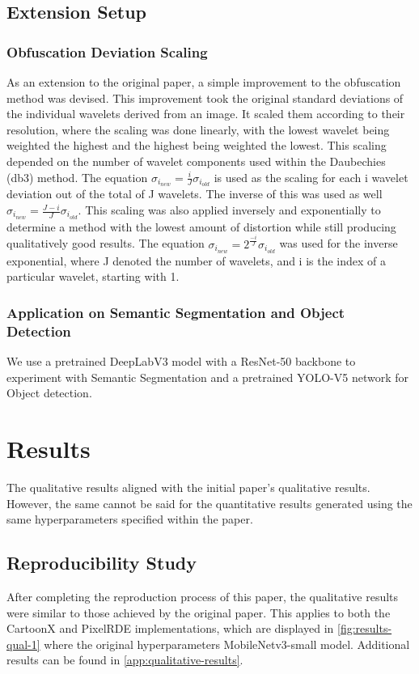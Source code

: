 \subsection{Extension Setup}
\subsubsection{Obfuscation Deviation Scaling}
As an extension to the original paper, a simple improvement to the obfuscation method was devised. This improvement took the original standard deviations of the individual wavelets derived from an image. It scaled them according to their resolution, where the scaling was done linearly, with the lowest wavelet being weighted the highest and the highest being weighted the lowest. This scaling depended on the number of wavelet components used within the Daubechies (db3) method. The equation $\sigma_{i_{new}} =\frac{i}{J}\sigma_{i_{old}}$ is used as the scaling for each i wavelet deviation out of the total of J wavelets. The inverse of this was used as well $\sigma_{i_{new}} =\frac{J-i}{J}\sigma_{i_{old}}$. This scaling was also applied inversely and exponentially to determine a method with the lowest amount of distortion while still producing qualitatively good results. The equation $\sigma_{i_{new}} = 2^{\frac{-i}{J}}\sigma_{i_{old}}$ was used for the inverse exponential, where J denoted the number of wavelets, and i is the index of a particular wavelet, starting with 1. 
\subsubsection{Application on Semantic Segmentation and Object Detection}
We use a pretrained DeepLabV3 model with a ResNet-50 backbone to experiment with Semantic Segmentation and a pretrained YOLO-V5 network for Object detection.
\section{Results}
\label{sec:results}
The qualitative results aligned with the initial paper's qualitative results. However, the same cannot be said for the quantitative results generated using the same hyperparameters specified within the paper.

\subsection{Reproducibility Study}
After completing the reproduction process of this paper, the qualitative results were similar to those achieved by the original paper. This applies to both the CartoonX and PixelRDE implementations, which are displayed in \autoref{fig:results-qual-1} where the original hyperparameters MobileNetv3-small model. Additional results can be found in \autoref{app:qualitative-results}.

